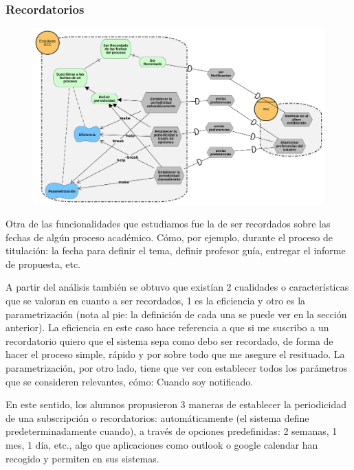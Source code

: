     \subsubsection{Recordatorios}
        \begin{figure}[ht]
            \centering
            \includegraphics[width=\textwidth]{media/imagenes/i_star/diagramas/Recordatorios.png}
            \caption{}
            \label{}
        \end{figure}

        \par Otra de las funcionalidades que estudiamos fue la de ser recordados sobre las fechas de algún proceso académico. Cómo, por ejemplo, durante el proceso de titulación: la fecha para definir el tema, definir profesor guía, entregar el informe de propuesta, etc.

        \par A partir del análisis también se obtuvo que existían 2 cualidades o características que se valoran en cuanto a ser recordados, 1 es la eficiencia y otro es la parametrización (nota al pie: la definición de cada una se puede ver en la sección anterior). La eficiencia en este caso hace referencia a que si me suscribo a un recordatorio quiero que el sistema sepa como debo ser recordado, de forma de hacer el proceso simple, rápido y por sobre todo que me asegure el resituado. La parametrización, por otro lado, tiene que ver con establecer todos los parámetros que se consideren relevantes, cómo: Cuando soy notificado.

        \par En este sentido, los alumnos propusieron 3 maneras de establecer la periodicidad de una subscripción o recordatorios: automáticamente (el sistema define predeterminadamente cuando), a través de opciones predefinidas: 2 semanas, 1 mes, 1 día, etc., algo que aplicaciones como outlook o google calendar han recogido y permiten en sus sistemas.

